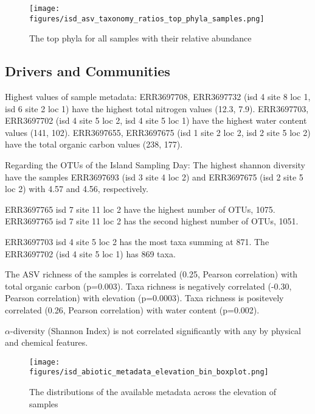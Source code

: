 \begin{figure}[hbt!]
      \centering
      \texttt{[image: figures/isd\_asv\_taxonomy\_ratios\_top\_phyla\_samples.png]}
      \caption[Top phyla of each samples]{The top phyla for all samples with their relative abundance}
      \label{fig:isd_top_phyla_samples}
\end{figure}
   

\subsection{Drivers and Communities}\label{isd_communities}
Highest values of sample metadata:
ERR3697708, ERR3697732 (isd 4 site 8 loc 1, isd 6 site 2 loc 1) have the highest total nitrogen values (12.3, 7.9).
ERR3697703, ERR3697702 (isd 4 site 5 loc 2, isd 4 site 5 loc 1) have the highest water content values (141, 102).
ERR3697655, ERR3697675 (isd 1 site 2 loc 2, isd 2 site 5 loc 2) have the total organic carbon values (238, 177).


Regarding the OTUs of the Island Sampling Day:
The highest shannon diversity have the samples ERR3697693 (isd 3 site 4 loc 2) and
ERR3697675 (isd 2 site 5 loc 2) with 4.57 and 4.56, respectively.

ERR3697765 isd 7 site 11 loc 2 have the highest number of OTUs, 1075.
ERR3697765 isd 7 site 11 loc 2 has the second highest number of OTUs, 1051.

ERR3697703 isd 4 site 5 loc 2 has the most taxa summing at 871.
The ERR3697702 (isd 4 site 5 loc 1) has 869 taxa.

The ASV richness of the samples is correlated (0.25, Pearson correlation) with total organic carbon (p=0.003).
Taxa richness is negatively correlated (-0.30, Pearson correlation) with elevation (p=0.0003). 
Taxa richness is positevely correlated (0.26, Pearson correlation) with water content (p=0.002).

$\alpha$-diversity (Shannon Index) is not correlated significantly with any
by physical and chemical features.


\begin{figure}[hbt!]
      \centering
      \texttt{[image: figures/isd\_abiotic\_metadata\_elevation\_bin\_boxplot.png]}
      \caption[Elevation and metadata distributions]{The distributions of the available metadata across the elevation of samples}
      \label{fig:isd_elevation_metadata}
\end{figure}

